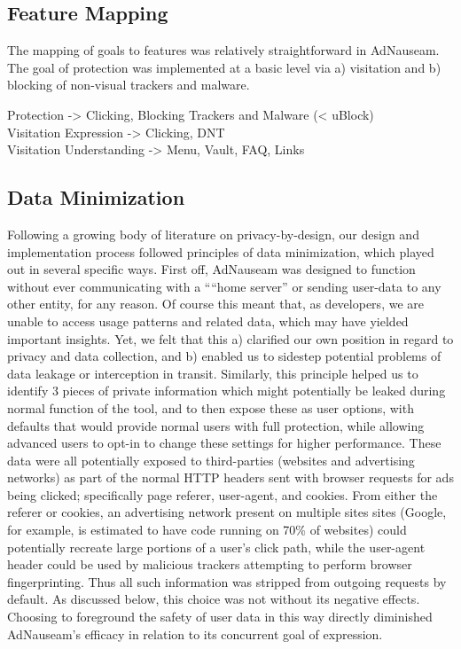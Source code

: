 \documentclass[conference]{IEEEtran}
\begin{document}
\subsection{Feature Mapping}

The mapping of goals to features was relatively straightforward in AdNauseam. The goal of protection was implemented at a basic level via a) visitation and b) blocking of non-visual trackers and malware.

Protection -> Clicking, Blocking Trackers and Malware (< uBlock)\\ Visitation
Expression -> Clicking, DNT\\  Visitation
Understanding -> Menu, Vault, FAQ, Links\\

\subsection{Data Minimization}

Following a growing body of literature on privacy-by-design\cite{Gurses-0, Hoepman, Gurses-1, Hansen, Cavoukian}, our design and implementation process followed principles of data minimization, which played out in several specific ways. First off, AdNauseam was designed to function without ever communicating with a ““home server” or sending user-data to any other entity, for any reason. Of course this meant that, as developers, we are unable to access usage patterns and related data, which may have yielded important insights. Yet, we felt that this a) clarified our own position in regard to privacy and data collection, and b) enabled us to sidestep potential problems of data leakage or interception in transit. Similarly, this principle helped us to identify 3 pieces of private information which might potentially be leaked during normal function of the tool, and to then expose these as user options, with defaults that would provide normal users with full protection, while allowing advanced users to opt-in to change these settings for higher performance. These data were all potentially exposed to third-parties (websites and advertising networks) as part of the normal HTTP headers sent with browser requests for ads being clicked; specifically page referer, user-agent, and cookies. From either the referer or cookies, an advertising network present on multiple sites sites (Google, for example, is estimated to have code running on 70\% of websites\cite{Englehardt}) could potentially recreate large portions of a user's click path, while the user-agent header could be used by malicious trackers attempting to perform browser fingerprinting\cite{Nikiforakis}. Thus all such information was stripped from outgoing requests by default. As discussed below, this choice was not without its negative effects. Choosing to foreground the safety of user data in this way directly diminished AdNauseam's efficacy in relation to its concurrent goal of expression.
\end{document}
